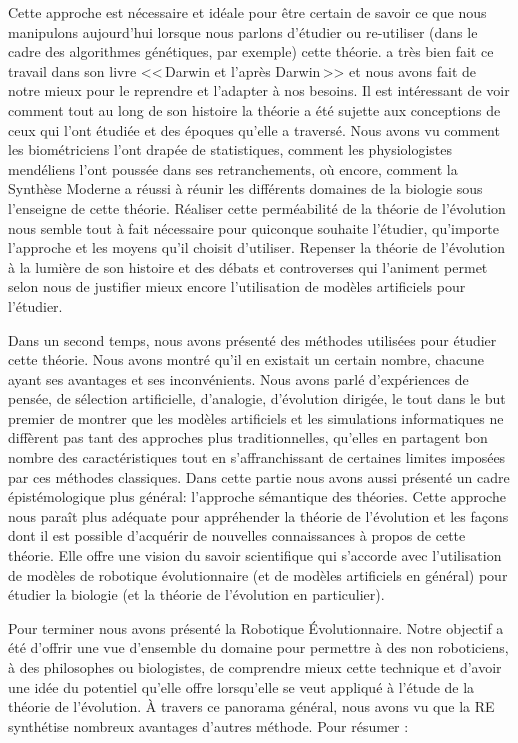 Cette approche est nécessaire et idéale pour être certain de savoir ce que nous manipulons aujourd'hui lorsque nous parlons d'étudier ou re-utiliser (dans le cadre des algorithmes génétiques, par exemple) cette théorie. \cite{gayon1991darwinetlapresdarwin} a très bien fait ce travail dans son livre <<\,Darwin et l'après Darwin\,>> et nous avons fait de notre mieux pour le reprendre et l'adapter à nos besoins. Il est intéressant de voir comment tout au long de son histoire la théorie a été sujette aux conceptions de ceux qui l'ont étudiée et des époques qu'elle a traversé. Nous avons vu comment les biométriciens l'ont drapée de statistiques, comment les physiologistes mendéliens l'ont poussée dans ses retranchements, où encore, comment la Synthèse Moderne a réussi à réunir les différents domaines de la biologie sous l'enseigne de cette théorie. Réaliser cette perméabilité de la théorie de l'évolution nous semble tout à fait nécessaire pour quiconque souhaite l'étudier, qu'importe l'approche et les moyens qu'il choisit d'utiliser. Repenser la théorie de l'évolution à la lumière de son histoire et des débats et controverses qui l'animent permet selon nous de justifier mieux encore l'utilisation de modèles artificiels pour l'étudier.

Dans un second temps, nous avons présenté des méthodes utilisées pour étudier cette théorie. Nous avons montré qu'il en existait un certain nombre, chacune ayant ses avantages et ses inconvénients. Nous avons parlé d'expériences de pensée, de sélection artificielle, d'analogie, d'évolution dirigée, le tout dans le but premier de montrer que les modèles artificiels et les simulations informatiques ne diffèrent pas tant des approches plus traditionnelles, qu'elles en partagent bon nombre des caractéristiques tout en s'affranchissant de certaines limites imposées par ces méthodes classiques. Dans cette partie nous avons aussi présenté un cadre épistémologique plus général: l'approche sémantique des théories. Cette approche nous paraît plus adéquate pour appréhender la théorie de l'évolution et les façons dont il est possible d'acquérir de nouvelles connaissances à propos de cette théorie. Elle offre une vision du savoir scientifique qui s'accorde avec l'utilisation de modèles de robotique évolutionnaire (et de modèles artificiels en général) pour étudier la biologie (et la théorie de l'évolution en particulier).

Pour terminer nous avons présenté la Robotique \'Evolutionnaire. Notre objectif a été d'offrir une vue d'ensemble du domaine pour permettre à des non roboticiens, à des philosophes ou biologistes, de comprendre mieux cette technique et d'avoir une idée du potentiel qu'elle offre lorsqu'elle se veut appliqué à l'étude de la théorie de l'évolution. \`A travers ce panorama général, nous  avons vu que la RE synthétise nombreux avantages d'autres méthode. Pour résumer : 


